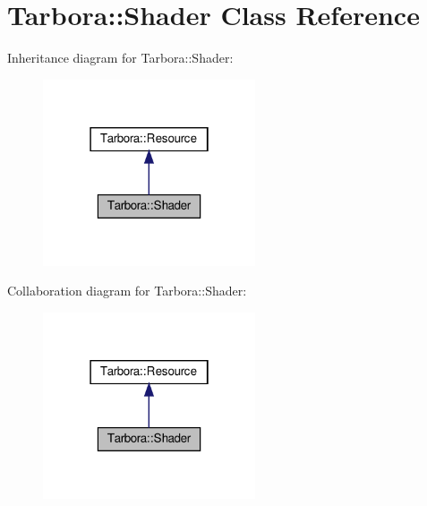 \hypertarget{classTarbora_1_1Shader}{}\section{Tarbora\+:\+:Shader Class Reference}
\label{classTarbora_1_1Shader}


Inheritance diagram for Tarbora\+:\+:Shader\+:\nopagebreak
\begin{figure}[H]
\begin{center}
\leavevmode
\includegraphics[width=178pt]{classTarbora_1_1Shader__inherit__graph}
\end{center}
\end{figure}


Collaboration diagram for Tarbora\+:\+:Shader\+:\nopagebreak
\begin{figure}[H]
\begin{center}
\leavevmode
\includegraphics[width=178pt]{classTarbora_1_1Shader__coll__graph}
\end{center}
\end{figure}
